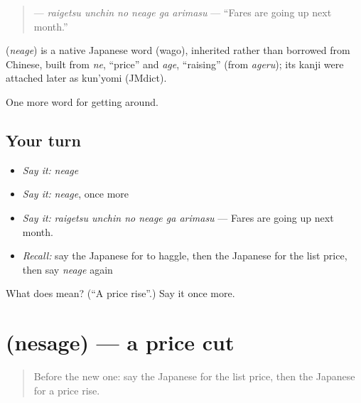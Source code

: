 \begin{quote}
\textbf{   } — \emph{raigetsu unchin no neage ga arimasu} — \textquotedblleft{}Fares are going up next month.\textquotedblright{}
\end{quote}

\begin{cousinweb}
\textbf{} (\emph{neage}) is a native Japanese word (wago), inherited rather than borrowed from Chinese, built from \emph{ne}, \textquotedblleft{}price\textquotedblright{} and \emph{age}, \textquotedblleft{}raising\textquotedblright{} (from \emph{ageru}); its kanji were attached later as kun'yomi (JMdict).
\end{cousinweb}

\begin{grammarlens}[title={What you've built}]
One more word for getting around.
\end{grammarlens}

\subsection*{Your turn}
\begin{itemize}
\raggedright
  \item \emph{Say it:} \emph{neage}
  \item \emph{Say it:} \emph{neage}, once more
  \item \emph{Say it:} \emph{raigetsu unchin no neage ga arimasu} — Fares are going up next month.
  \item \emph{Recall:} say the Japanese for to haggle, then the Japanese for the list price, then say \emph{neage} again
\end{itemize}

\begin{tcolorbox}[breakable,colback=teal!4,colframe=teal!35!black,title={Before you move on}]
What does  mean? (\textquotedblleft{}A price rise\textquotedblright{}.) Say it once more.
\end{tcolorbox}
\section[\texorpdfstring{\ja{ねさげ} (nesage)}{ねさげ (nesage)}]{ (nesage) — a price cut}

\label{lesson:JA-C421-nesage}



\begin{quote}
Before the new one: say the Japanese for the list price, then the Japanese for a price rise.
\end{quote}

